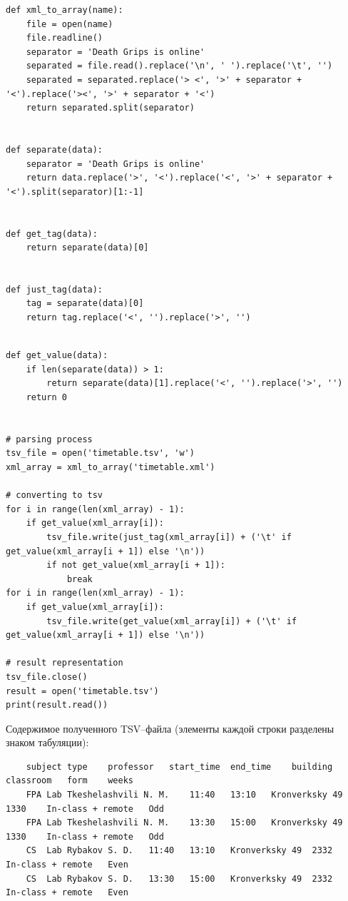 \documentclass[12pt]{article}
\begin{document}
\begin{verbatim}
def xml_to_array(name):
    file = open(name)
    file.readline()
    separator = 'Death Grips is online'
    separated = file.read().replace('\n', ' ').replace('\t', '')
    separated = separated.replace('> <', '>' + separator + '<').replace('><', '>' + separator + '<')
    return separated.split(separator)


def separate(data):
    separator = 'Death Grips is online'
    return data.replace('>', '<').replace('<', '>' + separator + '<').split(separator)[1:-1]


def get_tag(data):
    return separate(data)[0]


def just_tag(data):
    tag = separate(data)[0]
    return tag.replace('<', '').replace('>', '')
\end{verbatim}
\newpage
\begin{verbatim}

def get_value(data):
    if len(separate(data)) > 1:
        return separate(data)[1].replace('<', '').replace('>', '')
    return 0


# parsing process
tsv_file = open('timetable.tsv', 'w')
xml_array = xml_to_array('timetable.xml')

# converting to tsv
for i in range(len(xml_array) - 1):
    if get_value(xml_array[i]):
        tsv_file.write(just_tag(xml_array[i]) + ('\t' if get_value(xml_array[i + 1]) else '\n'))
        if not get_value(xml_array[i + 1]):
            break
for i in range(len(xml_array) - 1):
    if get_value(xml_array[i]):
        tsv_file.write(get_value(xml_array[i]) + ('\t' if get_value(xml_array[i + 1]) else '\n'))

# result representation
tsv_file.close()
result = open('timetable.tsv')
print(result.read())
\end{verbatim}

Содержимое полученного TSV--файла (элементы каждой строки разделены знаком табуляции):

\begin{verbatim}
    subject	type	professor	start_time	end_time	building	classroom	form	weeks
    FPA	Lab	Tkeshelashvili N. M.	11:40	13:10	Kronverksky 49	1330	In-class + remote	Odd
    FPA	Lab	Tkeshelashvili N. M.	13:30	15:00	Kronverksky 49	1330	In-class + remote	Odd
    CS	Lab	Rybakov S. D.	11:40	13:10	Kronverksky 49	2332	In-class + remote	Even
    CS	Lab	Rybakov S. D.	13:30	15:00	Kronverksky 49	2332	In-class + remote	Even
\end{verbatim}
\end{document}

